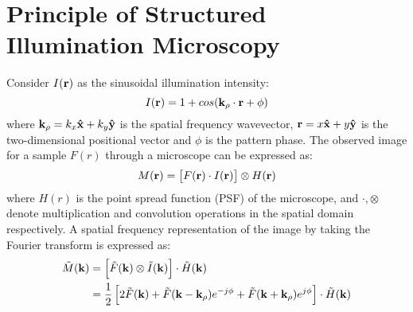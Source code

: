 \documentclass[11pt]{article}
\begin{document}
\section{Principle of Structured Illumination Microscopy}
%
Consider $I(\mathbf{r})$ as the sinusoidal illumination intensity:
%
\begin{equation}
  I(\mathbf{r}) = 1 + cos(\mathbf{k}_{\rho} \cdot \mathbf{r} + \phi)
  \label{eq:intensity}
\end{equation}
where $\mathbf{k}_{\rho} = k_x \mathbf{\hat{x}} + k_y \mathbf{\hat{y}}$ is the spatial frequency wavevector,  $\mathbf{r} = x \mathbf{\hat{x}} +  y \mathbf{\hat{y}}$ is the two-dimensional positional vector and $\phi$ is the pattern phase. The observed image for a sample $F(r)$ through a microscope can be expressed as:
%
\begin{equation}
  M(\mathbf{r}) = \left[ F(\mathbf{r}) \cdot I(\mathbf{r}) \right] \otimes H(\mathbf{r})
  \label{eq:m_spatial_image}
\end{equation}
%
where $H(r)$ is the point spread function (PSF) of the microscope, and $\cdot, \otimes$ denote multiplication and convolution operations in the spatial domain respectively. A spatial frequency representation of the image by taking the Fourier transform is expressed as:
%
\begin{equation}
  \begin{split}
    \tilde{M}(\mathbf{k}) &= \left[ \tilde{F}(\mathbf{k}) \otimes \tilde{I}(\mathbf{k}) \right] \cdot \tilde{H}(\mathbf{k}) \\
     &= \frac{1}{2} \left[ 2\tilde{F}(\mathbf{k}) + \tilde{F}(\mathbf{k} - \mathbf{k}_{\rho}) e^{- j \phi} + \tilde{F}(\mathbf{k} + \mathbf{k}_{\rho}) e^{j \phi} \right] \cdot \tilde{H}(\mathbf{k})
  \end{split}
  \label{eq:m_ft}
\end{equation}
\end{document}

